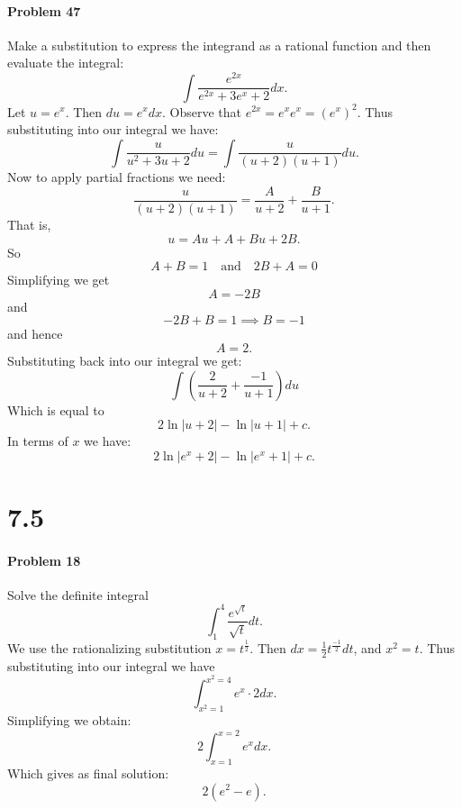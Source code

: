 \documentclass[letterpaper,12pt,oneside,onecolumn]{article}
\begin{document}
\paragraph{Problem 47}
Make a substitution to express the integrand as a rational function and then evaluate the integral:
$$\int\frac{e^{2x}}{e^{2x} + 3e^x + 2}dx.$$
Let $u = e^x$. Then $du = e^xdx$. Observe that $e^{2x} = e^xe^x = (e^x)^2$. Thus substituting into our integral we have:
$$\int \frac{u}{u^2 + 3u + 2}du
 = \int\frac{u}{(u+2)(u+1)}du.$$
 Now to apply partial fractions we need:
 $$\frac{u}{(u+2)(u+1)} = \frac{A}{u+2} + \frac{B}{u+1}.$$
 That is, $$u = Au +A +Bu + 2B.$$
 So $$A+B =1 \quad \text{and} \quad 2B + A = 0$$
 Simplifying we get
 $$A = -2B$$
 and
 $$-2B + B = 1 \implies B = -1$$
 and hence
 $$A = 2.$$
 Substituting back into our integral we get:
 $$\int(\frac{2}{u+2} + \frac{-1}{u+1})du$$
 Which is equal to
 $$2\ln|u+2| -\ln|u+1| + c.$$
 In terms of $x$ we have:
 $$2\ln|e^x + 2| -\ln|e^x+1| +c.$$
 \section*{7.5}
 \paragraph{Problem 18}
 Solve the definite integral
 $$\int_{1}^{4} \frac{e^{\sqrt{t}}}{\sqrt{t}}dt.$$
 We use the rationalizing substitution $x = t^\frac{1}{2}.$ Then $dx = \frac{1}{2}t^\frac{-1}{2}dt$, and $x^2 = t$. Thus substituting into our integral we have
 $$\int_{x^2=1}^{x^2=4} e^x \cdot 2dx.$$
 Simplifying we obtain:
 $$2\int_{x=1}^{x=2} e^x dx.$$
 Which gives as final solution:
 $$2(e^2 - e).$$
 
\end{document}
